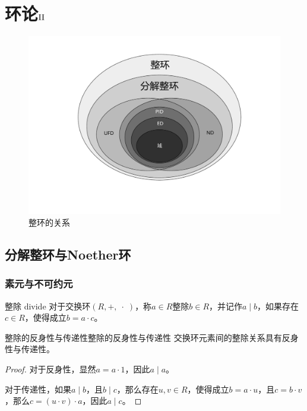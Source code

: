 % 

% 
	
\chapter{环论$\rm\Rmnum{2}$}

\begin{figure}[H]
	\centering
	\includegraphics[scale = 0.5]{../figure/整环}
	\caption{整环的关系}
\end{figure}

\section{分解整环与Noether环}

\subsection{素元与不可约元}

\begin{definition}{整除 divide}
	对于交换环$(R,+,\;\cdot\;)$，称$a\in R$整除$b\in R$，并记作$a\mid b$，如果存在$c\in R$，使得成立$b=a\cdot c$。
\end{definition}

\begin{proposition}{整除的反身性与传递性}{整除的反身性与传递性}
	交换环元素间的整除关系具有反身性与传递性。
\end{proposition}

\begin{proof}
	对于反身性，显然$a=a\cdot 1$，因此$a\mid a$。
	
	对于传递性，如果$a\mid b$，且$b\mid c$，那么存在$u,v\in R$，使得成立$b=a\cdot u$，且$c=b\cdot v$，那么$c=(u\cdot v)\cdot a$，因此$a\mid c$。
\end{proof}

